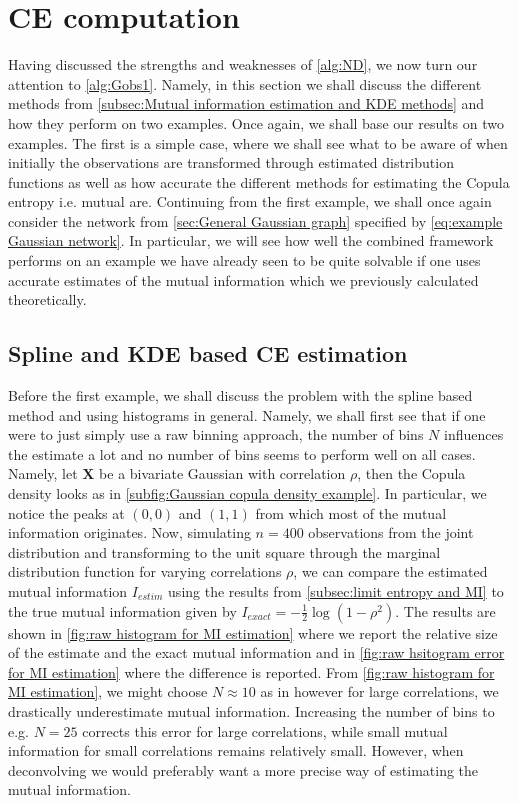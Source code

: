 \documentclass[../Thesis.tex]{subfiles}
\begin{document}
\section{CE computation}\label{sec:gaussian MI error}
Having discussed the strengths and weaknesses of \autoref{alg:ND}, we now turn our attention to \autoref{alg:Gobs1}. Namely, in this section we shall discuss the different methods from \autoref{subsec:Mutual information estimation and KDE methods} and how they perform on two examples. Once again, we shall base our results on two examples. The first is a simple case, where we shall see what to be aware of when initially the observations are transformed through estimated distribution functions as well as how accurate the different methods for estimating the Copula entropy i.e. mutual are. Continuing from the first example, we shall once again consider the network from \autoref{sec:General Gaussian graph} specified by \autoref{eq:example Gaussian network}. In particular, we will see how well the combined framework performs on an example we have already seen to be quite solvable if one uses accurate estimates of the mutual information which we previously calculated theoretically.



\subsection{Spline and KDE based CE estimation}
Before the first example, we shall discuss the problem with the spline based method and using histograms in general. Namely, we shall first see that if one were to just simply use a raw binning approach, the number of bins $N$ influences the estimate a lot and no number of bins seems to perform well on all cases. Namely, let $\boldsymbol X$ be a bivariate Gaussian with correlation $\rho$, then the Copula density looks as in \autoref{subfig:Gaussian copula density example}. In particular, we notice the peaks at $(0,0)$ and $(1,1)$ from which most of the mutual information originates. Now, simulating $n = 400$ observations from the joint distribution and transforming to the unit square through the marginal distribution function for varying correlations $\rho$, we can compare the estimated mutual information $I_{estim}$ using the results from \autoref{subsec:limit entropy and MI} to the true mutual information given by $ I_{exact} = - \frac{1}{2} \log \left(1 - \rho^2\right)$. The results are shown in \autoref{fig:raw histogram for MI estimation} where we report the relative size of the estimate and the exact mutual information and in \autoref{fig:raw hsitogram error for MI estimation} where the difference is reported. From \autoref{fig:raw histogram for MI estimation}, we might choose $N \approx 10$ as in \cite{Network-deconvolution-as-a-general-method-to-distinguish-direct-dependencies-in-networks} however for large correlations, we drastically underestimate mutual information. Increasing the number of bins to e.g. $N = 25$ corrects this error for large correlations, while small mutual information for small correlations remains relatively small. However, when deconvolving we would preferably want a more precise way of estimating the mutual information.
\end{document}
